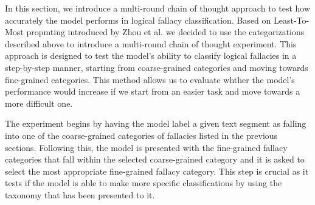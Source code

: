 In this section, we introduce a multi-round chain of thought approach to test how accurately the model performs in logical fallacy classification. Based on Least-To-Most propmting introduced by Zhou et al. \cite{zhou2023leasttomostpromptingenablescomplex} we decided to use the categorizations described above to introduce a multi-round chain of thought experiment. This approach is designed to test the model's ability to classify logical fallacies in a step-by-step manner, starting from coarse-grained categories and moving towards fine-grained categories. This method allows us to evaluate whther the model's performance would increase if we start from an easier task and move towards a more difficult one.
\par
The experiment begins by having the model label a given text segment as falling into one of the coarse-grained categories of fallacies listed in the previous sections. Following this, the model is presented with the fine-grained fallacy categories that fall within the selected coarse-grained category and it is asked to select the most appropriate fine-grained fallacy category. This step is crucial as it tests if the model is able to make more specific classifications by using the taxonomy that has been presented to it.
\par
